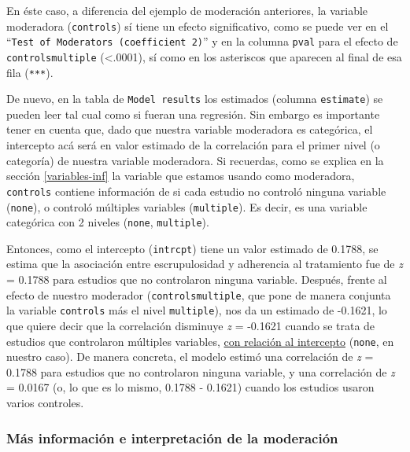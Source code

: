 \documentclass[
  bookmarksnumbered]{article}
\begin{document}
En éste caso, a diferencia del ejemplo de moderación anteriores, la variable moderadora (\texttt{controls}) sí tiene un efecto significativo, como se puede ver en el ``\texttt{Test\ of\ Moderators\ (coefficient\ 2)}'' y en la columna \texttt{pval} para el efecto de \texttt{controlsmultiple} (\textless.0001), sí como en los asteriscos que aparecen al final de esa fila (\texttt{***}).

De nuevo, en la tabla de \texttt{Model\ results} los estimados (columna \texttt{estimate}) se pueden leer tal cual como si fueran una regresión. Sin embargo es importante tener en cuenta que, dado que nuestra variable moderadora es categórica, el intercepto acá será en valor estimado de la correlación para el primer nivel (o categoría) de nuestra variable moderadora. Si recuerdas, como se explica en la sección \ref{variables-inf} la variable que estamos usando como moderadora, \texttt{controls} contiene información de si cada estudio no controló ninguna variable (\texttt{none}), o controló múltiples variables (\texttt{multiple}). Es decir, es una variable categórica con 2 niveles (\texttt{none}, \texttt{multiple}).

Entonces, como el intercepto (\texttt{intrcpt}) tiene un valor estimado de 0.1788, se estima que la asociación entre escrupulosidad y adherencia al tratamiento fue de \emph{z} = 0.1788 para estudios que no controlaron ninguna variable. Después, frente al efecto de nuestro moderador (\texttt{controlsmultiple}, que pone de manera conjunta la variable \texttt{controls} más el nivel \texttt{multiple}), nos da un estimado de -0.1621, lo que quiere decir que la correlación disminuye \emph{z} = -0.1621 cuando se trata de estudios que controlaron múltiples variables, \underline{con relación al intercepto} (\texttt{none}, en nuestro caso). De manera concreta, el modelo estimó una correlación de \emph{z} = 0.1788 para estudios que no controlaron ninguna variable, y una correlación de \emph{z} = 0.0167 (o, lo que es lo mismo, 0.1788 - 0.1621) cuando los estudios usaron varios controles.

\hypertarget{pred-mods2}{%
\subsubsection{Más información e interpretación de la moderación}\label{pred-mods2}}
\end{document}

